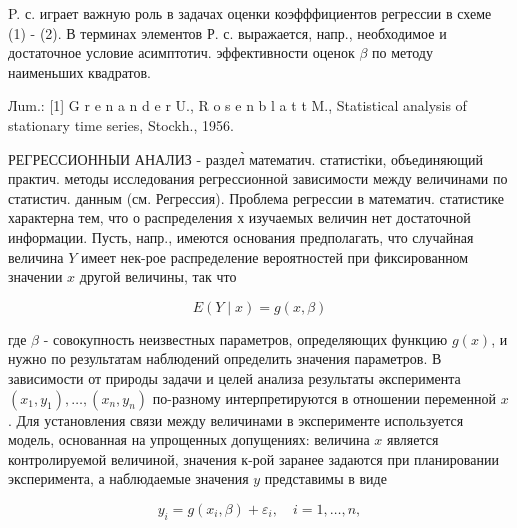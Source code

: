 \documentclass[10pt]{article}
\begin{document}
P. с. играет важную роль в задачах оценки коэфффициентов регрессии в схеме (1) - (2). В терминах элементов Р. с. выражается, напр., необходимое и достаточное условие асимптотич. эффективности оценок $\beta$ по методу наименьших квадратов.



Лum.: [1] G r e n a n d e r U., R o s e n b l a t t M., Statistical analysis of stationary time series, Stockh., 1956.



РЕГРЕССИОННЫИ АНАЛИЗ - раздел̀ математич. статистіки, объединяющий практич. методы исследования регрессионноӥ зависимости между величинами по статистич. данным (см. Регрессия). Проблема регрессии в математич. статистике характерна тем, что о распределения х изучаемых величин нет достаточной информации. Пусть, напр., имеются основания предполагать, что случайная величина $Y$ имеет нек-рое распределение вероятностей при фиксированном значении $x$ другой величины, так что



\[

E(Y \mid x)=g(x, \beta)

\]



где $\beta$ - совокупность неизвестных параметров, определяющих функцию $g(x)$, и нужно по результатам наблюдений определить значения параметров. В зависимости от природы задачи и целей анализа результаты әксперимента $\left(x_{1}, y_{1}\right), \ldots,\left(x_{n}, y_{n}\right)$ по-разному интерпретируются в отношении переменной $x$. Для установления связи между величинами в эксперименте используется модель, основанная на упрощенных допущениях: величина $x$ является контролируемой величиной, значения к-рой заранее задаются при планировании эксперимента, а наблюдаемые значения $y$ представимы в виде



\[

y_{i}=g\left(x_{i}, \beta\right)+\varepsilon_{i}, \quad i=1, \ldots, n,

\]
\end{document}
